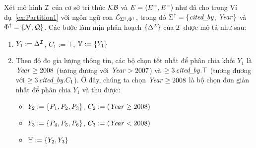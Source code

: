 \begin{Example}
\label{ex:Partition2}
Xét mô hình $\mathcal{I}$ của cơ sở tri thức $\mathcal{KB}$ và $E = \left\langle E^+, E^-\right\rangle\!$ như đã cho trong Ví dụ~\ref{ex:Partition1} với ngôn ngữ con $\mathcal{L}_{\Sigma^\dag,\Phi^\dag}$, trong đó $\Sigma^\dag = \{\mathit{cited\!\_\!by}$, $\mathit{Year}\}$ và $\Phi^\dag = \{\mathcal{N},\mathcal{Q}\}$. Các bước làm mịn phân hoạch $\{\Delta^{\mathcal{I}}\}$ của $\mathcal{I}$ được mô tả như sau:
\begin{enumerate}
	\item $Y_1 := \Delta^{\mathcal{I}}$, $C_1 := \top$, $\mathbb{Y} := \{Y_1\}$
	\item Theo độ đo gia lượng thông tin, các bộ chọn tốt nhất để phân chia khối $Y_1$ là \mbox{$\mathit{Year} \geq 2008$} (tương đương với \mbox{$\mathit{Year} > 2007$}) và \mbox{$\geq 3\,\mathit{cited\!\_\!by}.\top$} (tương đương với \mbox{$\geq 3\,\mathit{cited\!\_\!by}.C_1$}). Ở đây, chúng ta chọn \mbox{$\mathit{Year} \geq 2008$} là bộ chọn đơn giản nhất để phân chia $Y_1$ và thu được:
	\begin{itemize}
		\item $Y_2 := \{\mathit{P}_1, \mathit{P}_2, \mathit{P}_3\}$, $C_2 := (\mathit{Year} \geq 2008)$
		\item $Y_3 := \{\mathit{P}_4, \mathit{P}_5, \mathit{P}_6\}$, $C_3 := (\mathit{Year} < 2008)$
		\item $\mathbb{Y} := \{Y_2, Y_3\}$
	\end{itemize}
	

\end{enumerate}
\end{Example}
